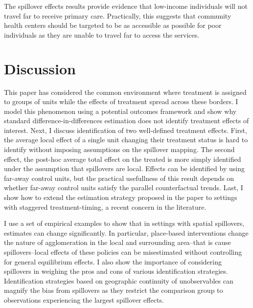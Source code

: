The spillover effects results provide evidence that low-income individuals will not travel far to receive primary care. Practically, this suggests that community health centers should be targeted to be as accessible as possible for poor individuals as they are unable to travel far to access the services. 

\section{Discussion}
\label{sec:conclusion}

This paper has considered the common environment where treatment is assigned to groups of units while the effects of treatment spread across these borders. I model this phenomenon using a potential outcomes framework and show why standard difference-in-differences estimation does not identify treatment effects of interest. Next, I discuss identification of two well-defined treatment effects. First, the average local effect of a single unit changing their treatment status is hard to identify without imposing assumptions on the spillover mapping. The second effect, the post-hoc average total effect on the treated is more simply identified under the assumption that spillovers are local. Effects can be identified by using far-away control units, but the practical usefullness of this result depends on whether far-away control units satisfy the parallel counterfactual trends. Last, I show how to extend the estimation strategy proposed in the paper to settings with staggered treatment-timing, a recent concern in the literature. 

I use a set of empirical examples to show that in settings with spatial spillovers, estimates can change significantly. In particular, place-based interventions change the nature of agglomeration in the local and surrounding area--that is cause spillovers--local effects of these policies can be misestimated without controlling for general equilibrium effects. I also show the importance of considering spillovers in weighing the pros and cons of various identification strategies. Identification strategies based on geographic continuity of unobservables can magnify the bias from spillovers as they restrict the comparison group to observations experiencing the largest spillover effects.



